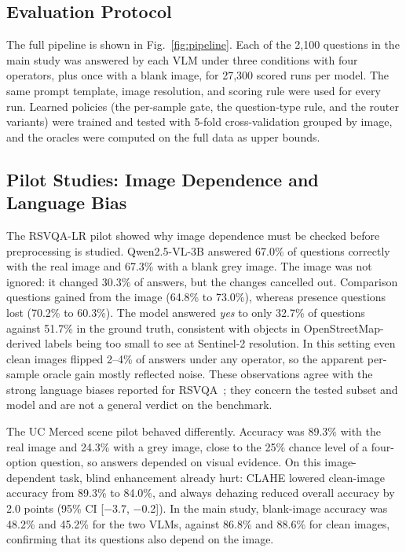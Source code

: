 \documentclass[lettersize,journal]{IEEEtran}
\begin{document}
\subsection{Evaluation Protocol}

The full pipeline is shown in Fig.~\ref{fig:pipeline}. Each of the 2,100 questions in the main study was answered by each VLM under three conditions with four operators, plus once with a blank image, for 27,300 scored runs per model. The same prompt template, image resolution, and scoring rule were used for every run. Learned policies (the per-sample gate, the question-type rule, and the router variants) were trained and tested with 5-fold cross-validation grouped by image, and the oracles were computed on the full data as upper bounds.

\subsection{Pilot Studies: Image Dependence and Language Bias}
\label{sec:pilot}

The RSVQA-LR pilot showed why image dependence must be checked before preprocessing is studied. Qwen2.5-VL-3B answered 67.0\% of questions correctly with the real image and 67.3\% with a blank grey image. The image was not ignored: it changed 30.3\% of answers, but the changes cancelled out. Comparison questions gained from the image (64.8\% to 73.0\%), whereas presence questions lost (70.2\% to 60.3\%). The model answered \emph{yes} to only 32.7\% of questions against 51.7\% in the ground truth, consistent with objects in OpenStreetMap-derived labels being too small to see at Sentinel-2 resolution. In this setting even clean images flipped 2--4\% of answers under any operator, so the apparent per-sample oracle gain mostly reflected noise. These observations agree with the strong language biases reported for RSVQA~\cite{chappuis2023curse}; they concern the tested subset and model and are not a general verdict on the benchmark.

The UC Merced scene pilot behaved differently. Accuracy was 89.3\% with the real image and 24.3\% with a grey image, close to the 25\% chance level of a four-option question, so answers depended on visual evidence. On this image-dependent task, blind enhancement already hurt: CLAHE lowered clean-image accuracy from 89.3\% to 84.0\%, and always dehazing reduced overall accuracy by 2.0 points (95\% CI [$-$3.7, $-$0.2]). In the main study, blank-image accuracy was 48.2\% and 45.2\% for the two VLMs, against 86.8\% and 88.6\% for clean images, confirming that its questions also depend on the image.
\end{document}
